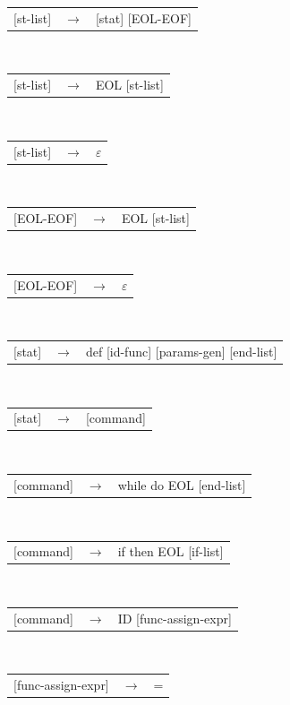 \documentclass[11pt, a4paper]{article}
\begin{document}
\newpage
\begin{algorithm}[H]
\label{tab:1}
  \SetInd{0em}{1em}
  \SetNlSty{}{}{:}
  \SetNlSkip{-1em}
  \Indp
  \Indp
  \BlankLine
  \begin{tabularx}{\textwidth}{l>{$}c<{$}X}
 {[st-list]} &\rightarrow& [stat] [EOL-EOF]
\end{tabularx}\\
  \begin{tabularx}{\textwidth}{l>{$}c<{$}X}
  {[st-list]} &\rightarrow& EOL [st-list]
\end{tabularx}\\
  \begin{tabularx}{\textwidth}{l>{$}c<{$}X}
  {[st-list]} &\rightarrow& $\varepsilon$
\end{tabularx}\\ 
  \begin{tabularx}{\textwidth}{l>{$}c<{$}X}
  {[EOL-EOF]} &\rightarrow& EOL [st-list]
\end{tabularx}\\ 
  \begin{tabularx}{\textwidth}{l>{$}c<{$}X}
  {[EOL-EOF]} &\rightarrow& $\varepsilon$
\end{tabularx}\\ 
  \begin{tabularx}{\textwidth}{l>{$}c<{$}X}
  {[stat]}    &\rightarrow& def [id-func] [params-gen] [end-list]
\end{tabularx}\\ 
  \begin{tabularx}{\textwidth}{l>{$}c<{$}X}
  {[stat]}    &\rightarrow& [command]
\end{tabularx}\\ 
  \begin{tabularx}{\textwidth}{l>{$}c<{$}X}
  {[command]} &\rightarrow& while do EOL [end-list]
\end{tabularx}\\ 
  \begin{tabularx}{\textwidth}{l>{$}c<{$}X}
  {[command]} &\rightarrow& if then EOL [if-list]
\end{tabularx}\\ 
  \begin{tabularx}{\textwidth}{l>{$}c<{$}X}
  {[command]} &\rightarrow& ID [func-assign-expr]
\end{tabularx}\\ 
  \begin{tabularx}{\textwidth}{l>{$}c<{$}X}
  {[func-assign-expr]} &\rightarrow& = 
\end{tabularx}\\ 

\end{algorithm}
\end{document}
